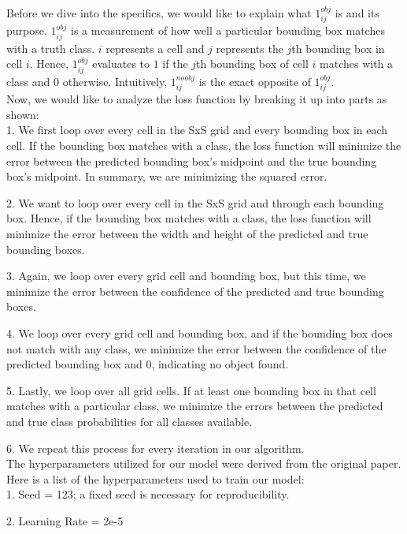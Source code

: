 \documentclass{article}
\begin{document}
Before we dive into the specifics, we would like to explain what $1_{ij}^{obj}$ is and its purpose. $1_{ij}^{obj}$ is a measurement of how well a particular bounding box matches with a truth class. $i$ represents a cell and $j$ represents the $j$th bounding box in cell $i$. Hence, $1_{ij}^{obj}$ evaluates to $1$ if the $j$th bounding box of cell $i$ matches with a class and 0 otherwise. Intuitively, $1_{ij}^{noobj}$ is the exact opposite of $1_{ij}^{obj}$. \\

Now, we would like to analyze the loss function by breaking it up into parts as shown: \\

1. We first loop over every cell in the SxS grid and every bounding box in each cell. If the bounding box matches with a class, the loss function will minimize the error between the predicted bounding box's midpoint and the true bounding box's midpoint. In summary, we are minimizing the squared error.

2. We want to loop over every cell in the SxS grid and through each bounding box. Hence, if the bounding box matches with a class, the loss function will minimize the error between the width and height of the predicted and true bounding boxes.

3. Again, we loop over every grid cell and bounding box, but this time, we minimize the error between the confidence of the predicted and true bounding boxes.

4. We loop over every grid cell and bounding box, and if the bounding box does not match with any class, we minimize the error between the confidence of the predicted bounding box and 0, indicating no object found.

5. Lastly, we loop over all grid cells. If at least one bounding box in that cell matches with a particular class, we minimize the errors between the predicted and true class probabilities for all classes available.

6. We repeat this process for every iteration in our algorithm. \\

The hyperparameters utilized for our model were derived from the original paper. Here is a list of the hyperparameters used to train our model: \\

1. Seed = 123; a fixed seed is necessary for reproducibility. 		

2. Learning Rate = 2e-5 	
\end{document}
